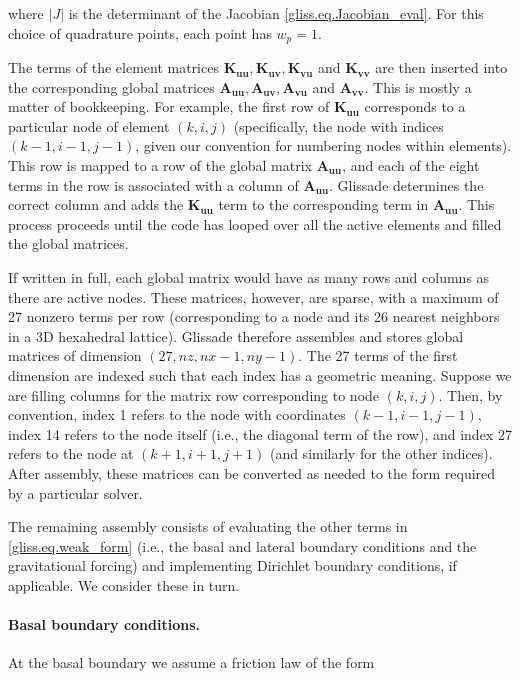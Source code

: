 \noindent
where $|J|$ is the determinant of the Jacobian \eqref{gliss.eq.Jacobian_eval}. For this choice of quadrature points,
each point has $w_p = 1$.

The terms of the element matrices $\mathbf{K_{uu}}, \mathbf{K_{uv}}, \mathbf{K_{vu}}$ and $\mathbf{K_{vv}}$
are then inserted into the corresponding global matrices $\mathbf{A_{uu}}, \mathbf{A_{uv}}, \mathbf{A_{vu}}$ and $\mathbf{A_{vv}}$.
This is mostly a matter of bookkeeping.
For example, the first row of $\mathbf{K_{uu}}$ corresponds to a particular node of element $(k,i,j)$
(specifically, the node with indices $(k-1,i-1,j-1)$, given our convention for numbering nodes within elements).  
This row is mapped to a row of the global matrix $\mathbf{A_{uu}}$, 
and each of the eight terms in the row is associated with a column of $\mathbf{A_{uu}}$.  
Glissade determines the correct column
and adds the $\mathbf{K_{uu}}$ term to the corresponding term in $\mathbf{A_{uu}}$.  This process proceeds
until the code has looped over all the active elements and filled the global matrices.

If written in full, each global matrix would have as many rows and columns as there are active nodes.
These matrices, however, are sparse, with a maximum of 27 nonzero terms per row (corresponding to
a node and its 26 nearest neighbors in a 3D hexahedral lattice).
Glissade therefore assembles and stores global matrices of dimension $(27,nz,nx-1,ny-1)$.
The 27 terms of the first dimension are indexed such that each index has a geometric meaning.
Suppose we are filling columns for the matrix row corresponding to node $(k,i,j)$. 
Then, by convention, index 1 refers to the node with coordinates $(k-1,i-1,j-1)$, index 14 refers to the
node itself (i.e., the diagonal term of the row), and index 27 refers to the node at $(k+1,i+1,j+1)$
(and similarly for the other indices).
After assembly, these matrices can be converted as needed to the form required by a particular solver.

The remaining assembly consists of evaluating the other terms in \eqref{gliss.eq.weak_form}
(i.e., the basal and lateral boundary conditions and the gravitational forcing) and implementing
Dirichlet boundary conditions, if applicable. We consider these in turn.

\paragraph{Basal boundary conditions.}

At the basal boundary we assume a friction law of the form 

